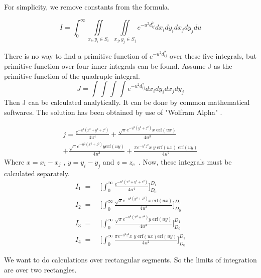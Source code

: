 \documentclass[final,5p,times,twocolumn]{elsarticle}
\begin{document}
For simplicity, we remove constants from the formula.

\begin{equation}
\label {eq10}
I = \int_0^{\infty}\iint\limits_{x_i, y_i \in S_i}\ \  \iint\limits_{x_j, y_j \in S_j}  e^{-u^2 d_{ij}^2} dx_i dy_i dx_j dy_j du
\end{equation}

There is no way to find a primitive function of $e^{-u^2 d_{ij}^2}$ over these five integrals, but primitive function over four inner integrals can be found. Assume J as the primitive function of the quadruple integral.
\begin{equation}
\label {eq11}
J = \int \int \int \int e^{-u^2 d_{ij}^2 } dx_i dy_i dx_j dy_j  
\end{equation}
Then J can be calculated analytically. It can be done by common mathematical softwares. The solution has been obtained by use of "Wolfram Alpha" \cite{Wolfram}.

\begin{equation}\label {eq12}
\begin{split}
j = \frac{e^{-u^2(x^2+y^2+z^2)}}{4u^4} + \frac{\sqrt{\pi}e^{-u^2(y^2 + z^2)}x\; \mathrm{erf}(u x)}{4u^3} \\
+\frac{\sqrt{\pi}e^{-u^2(x^2 + z^2)}y \mathrm {erf}(u y)}{4u^3} + \frac{\pi e^{-u^2 z^2}x\;y\; \mathrm{erf}(u x)\; \mathrm{erf}(u y)}{4u^2}
\end{split}
\end{equation}
Where $x = x_i - x_j$ , $y = y_i - y_j$ and $z = z_c$\ . 
Now, these integrals must be calculated separately.
\begin{equation}\label {eq13}
\begin{split}
I_1\; = \;&\bigg[\int_0^{\infty}\frac{e^{-u^2(x^2+y^2+z^2)}} {4u^4}\bigg]_{D_0}^{D_1}\\
I_2\; = \;&\bigg[\int_0^{\infty}\frac{\sqrt{\pi}e^{-u^2(y^2 + z^2)}x\; \mathrm{erf}(u x)}{4u^3}\bigg]_{D_0}^{D_1}\\
I_3\; = \;&\bigg[\int_0^{\infty}\frac{\sqrt{\pi}e^{-u^2(x^2 + z^2)}y\; \mathrm {erf}(u y)}{4u^3}\bigg]_{D_0}^{D_1}\\
I_4\; = \;&\bigg[\int_0^{\infty}\frac{\pi e^{-u^2 z^2}x\; y\; \mathrm{erf}(u x) \mathrm{erf}(u y)}{4u^2}\bigg]_{D_0}^{D_1}
\end{split}
\end{equation}

We want to do calculations over rectangular segments. So the limits of integration are over two rectangles.
\end{document}
